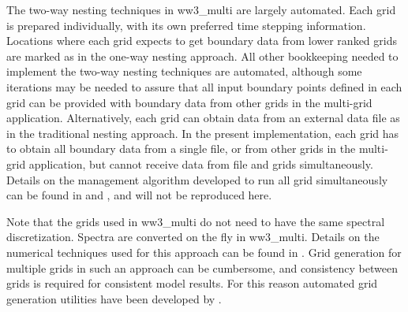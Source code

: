 \vspace{\baselineskip} 
\noindent 
The two-way nesting techniques in {\file ww3\_multi} are largely automated.
Each grid is prepared individually, with its own preferred time stepping
information. Locations where each grid expects to get boundary data from lower
ranked grids are marked
as in the one-way nesting approach. All other bookkeeping needed to implement
the two-way nesting techniques are automated, although some iterations may be
needed to assure that all input boundary points defined in each grid can be
provided with boundary data from other grids in the multi-grid application.
Alternatively, each grid can obtain data from an external data file as in the
traditional nesting approach. In the present implementation, each grid has to
obtain all boundary data from a single file, or from other grids in the
multi-grid application, but cannot receive data from file and grids
simultaneously. Details on the management algorithm developed to run all grid
simultaneously can be found in \citet[section 3.4]{tol:MMAB07b} and
\cite{tol:OMOD08b}, and will not be reproduced here.

Note that the grids used in {\file ww3\_multi} do not need to have the same
spectral discretization. Spectra are converted on the fly in {\file
ww3\_multi}. Details on the numerical techniques used for this approach can be
found in \citet[section 3.5.5]{tol:MMAB07b}.
Grid generation for multiple grids in such an approach can be cumbersome, and
consistency between grids is required for consistent model results. For this
reason automated grid generation utilities have been developed by
\cite{tol:MMAB07a, tol:OMOD08a}.
